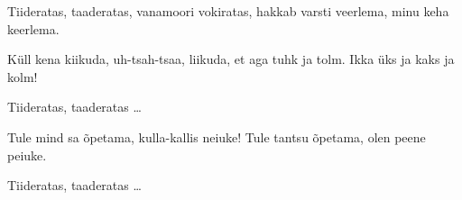 Tiideratas, taaderatas, vanamoori vokiratas,
hakkab varsti veerlema, minu keha keerlema.

K\"ull kena kiikuda, uh-tsah-tsaa, liikuda,
et aga tuhk ja tolm. Ikka \"uks ja kaks ja kolm!

Tiideratas, taaderatas \ldots

Tule mind sa \~opetama, kulla-kallis neiuke!
Tule tantsu \~opetama, olen peene peiuke.

Tiideratas, taaderatas \ldots